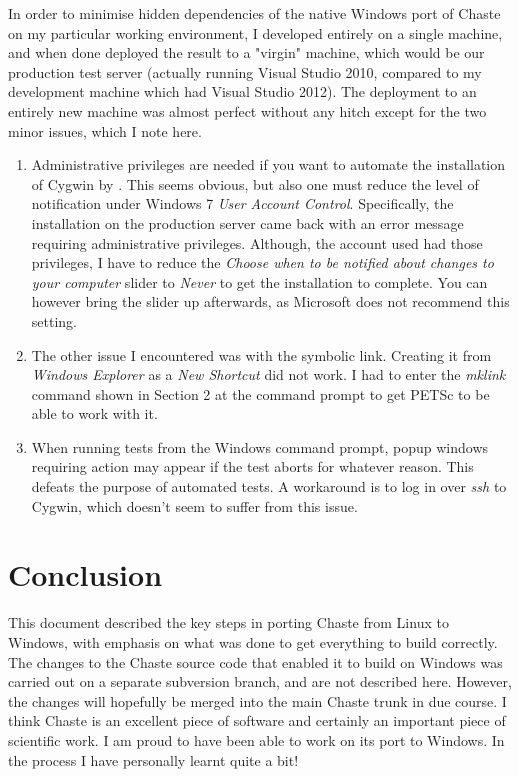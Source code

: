 \documentclass[10pt,a4paper]{article}
\begin{document}
\begin{parchment}[Note]
In order to minimise hidden dependencies of the native Windows port of Chaste on
my particular working environment, I developed entirely on a single machine, and
when done deployed the result to a "virgin" machine, which would be our
production test server (actually running Visual Studio 2010, compared to my
development machine which had Visual Studio 2012). The deployment to an entirely
new machine was almost perfect without any hitch except for the two minor
issues, which I note here.
\begin{enumerate}
\item Administrative privileges are needed if you want to automate the
installation of Cygwin by \chastelibbuilder. This seems obvious, but also one
must reduce the level of notification under Windows 7 \textit{User Account
Control}. Specifically, the installation on the production server came back with
an error message requiring administrative privileges. Although, the account used
had those privileges, I have to reduce the \textit{Choose when to be notified
about changes to your computer} slider to \textit{Never} to get the installation
to complete. You can however bring the slider up afterwards, as Microsoft does
not recommend this setting.
\item The other issue I encountered was with the symbolic link. Creating it from
\textit{Windows Explorer} as a \textit{New Shortcut} did not work. I had to
enter the \textit{mklink} command shown in Section 2 at the command prompt to get PETSc to be able to work with it.
\item When running tests from the Windows command prompt, popup windows requiring action may appear if the test aborts for whatever reason. This defeats the purpose of automated tests. A workaround is to log in over \textit{ssh} to Cygwin, which doesn't seem to suffer from this issue.
\end{enumerate}    
\end{parchment}

\section{Conclusion}
This document described the key steps in porting Chaste from Linux to Windows, with emphasis on what was done to get everything to build correctly. The changes to the Chaste source code that enabled it to build on Windows was carried out on a separate subversion branch, and are not described here. However, the changes will hopefully be merged into the main Chaste trunk in due course. I think Chaste is an excellent piece of software and certainly an important piece of scientific work. I am proud to have been able to work on its port to Windows. In the process I have personally learnt quite a bit!
\end{document}
